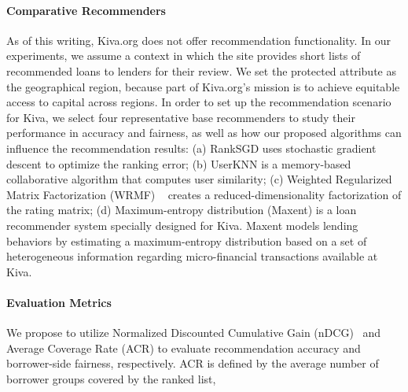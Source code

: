\paragraph{\textbf{Comparative Recommenders}}
As of this writing, Kiva.org does not offer recommendation functionality. In our experiments, we assume a context in which the site provides short lists of recommended loans to lenders for their review. We set the protected attribute as the geographical region, because part of Kiva.org's mission is to achieve equitable access to capital across regions. In order to set up the recommendation scenario for Kiva, we select four representative base recommenders to study their performance in accuracy and fairness, as well as how our proposed algorithms can influence the recommendation results: (a) RankSGD \cite{pmlr-v18-jahrer12b} uses stochastic gradient descent to optimize the ranking error; (b) UserKNN \cite{resnick1997recommender}  is a memory-based collaborative algorithm that computes user similarity; (c) Weighted Regularized Matrix Factorization (WRMF) ~\cite{hu2008collaborative} creates a reduced-dimensionality factorization of the rating matrix; (d) Maximum-entropy distribution (Maxent) \cite{choo2014gather} is a loan recommender system specially designed for Kiva. Maxent models lending behaviors by estimating a maximum-entropy distribution based on a set of heterogeneous information regarding micro-financial transactions available at Kiva.


\paragraph{\textbf{Evaluation Metrics}}

We propose to utilize Normalized Discounted Cumulative Gain (nDCG)~\cite{jarvelin2002cumulated} and Average Coverage Rate (ACR) to evaluate recommendation accuracy and borrower-side fairness, respectively. ACR is defined by the average number of borrower groups covered by the ranked list,


